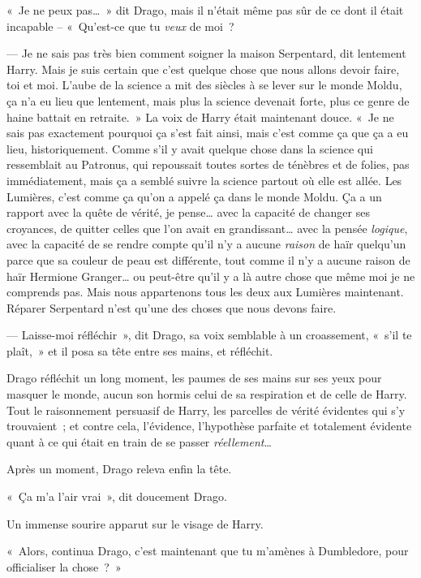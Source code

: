 «~Je ne peux pas…~»
dit Drago, mais il n'était même pas sûr de ce dont il était incapable -- «~Qu'est-ce que tu \emph{veux} de moi~?

--- Je ne sais pas très bien comment soigner la maison Serpentard, dit lentement Harry.
Mais je suis certain que c'est quelque chose que nous allons devoir faire, toi et moi.
L'aube de la science a mit des siècles à se lever sur le monde Moldu, ça n'a eu lieu que lentement, mais plus la science devenait forte, plus ce genre de haine battait en retraite.~»
La voix de Harry était maintenant douce.
«~Je ne sais pas exactement pourquoi ça s'est fait ainsi, mais c'est comme ça que ça a eu lieu, historiquement.
Comme s'il y avait quelque chose dans la science qui ressemblait au Patronus, qui repoussait toutes sortes de ténèbres et de folies, pas immédiatement, mais ça a semblé suivre la science partout où elle est allée.
Les Lumières, c'est comme ça qu'on a appelé ça dans le monde Moldu.
Ça a un rapport avec la quête de vérité, je pense… avec la capacité de changer ses croyances, de quitter celles que l'on avait en grandissant… avec la pensée \emph{logique}, avec la capacité de se rendre compte qu'il n'y a aucune \emph{raison} de haïr quelqu'un parce que sa couleur de peau est différente, tout comme il n'y a aucune raison de haïr Hermione Granger… ou peut-être qu'il y a là autre chose que même moi je ne comprends pas.
Mais nous appartenons tous les deux aux Lumières maintenant.
Réparer Serpentard n'est qu'une des choses que nous devons faire.

--- Laisse-moi réfléchir~», dit Drago, sa voix semblable à un croassement, «~s'il te plaît,~» et il posa sa tête entre ses mains, et réfléchit.

\later

Drago réfléchit un long moment, les paumes de ses mains sur ses yeux pour masquer le monde, aucun son hormis celui de sa respiration et de celle de Harry.
Tout le raisonnement persuasif de Harry, les parcelles de vérité évidentes qui s'y trouvaient~; et contre cela, l'évidence, l'hypothèse parfaite et totalement évidente quant à ce qui était en train de se passer \emph{réellement}…

Après un moment, Drago releva enfin la tête.

«~Ça m'a l'air vrai~», dit doucement Drago.

Un immense sourire apparut sur le visage de Harry.

«~Alors, continua Drago, c'est maintenant que tu m'amènes à Dumbledore, pour officialiser la chose~?~»

